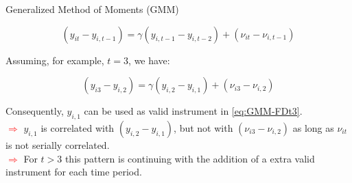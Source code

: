 \documentclass{beamer}
\begin{document}
\begin{frame}[label=GMM]{Generalized Method of Moments (GMM)}
\begin{itemize}
\vspace{-5pt}
\begin{equation} \label{eq:GMM-FD}
(y_{it} - y_{i,t-1}) = \gamma (y_{i,t-1} - y_{i,t-2}) + (\nu_{it} - \nu_{i,t-1})
\end{equation}


{\scriptsize\item Assuming, for example, $t=3$, we have:}

\vspace{-5pt}
\begin{equation} \label{eq:GMM-FDt3}
(y_{i3} - y_{i,2}) = \gamma (y_{i,2} - y_{i,1}) + (\nu_{i3} - \nu_{i,2})
\end{equation}

\vspace{5pt}
{\scriptsize\item Consequently, $y_{i,1}$ can be used as valid instrument in \eqref{eq:GMM-FDt3}. 
\\ \tiny\textcolor{red}{$\Longrightarrow$} $y_{i,1}$ is correlated with $(y_{i,2} - y_{i,1})$, but not with $(\nu_{i3} - \nu_{i,2})$ as long as $\nu_{it}$ is not serially correlated.
\vspace{-7pt}
\\ \tiny\textcolor{red}{$\Longrightarrow$} For $t>3$ this pattern is continuing with the addition of a extra valid instrument for each time period.}
\end{itemize}
\end{frame}
\end{document}
